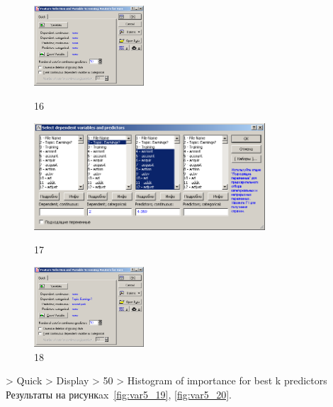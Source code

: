 \begin{figure}[!h]
  \centering

  \begin{minipage}{0.22\textwidth}
    \centering

    \includegraphics[height=3cm]
    {inc/var5/16.PNG}

    \caption{16}

    \label{fig:var5_16}
  \end{minipage}
  \begin{minipage}{0.52\textwidth}
    \centering

    \includegraphics[height=4cm]
    {inc/var5/17.PNG}

    \caption{17}

    \label{fig:var5_17}
  \end{minipage}
  \begin{minipage}{0.22\textwidth}
    \centering

    \includegraphics[height=3cm]
    {inc/var5/18.PNG}

    \caption{18}

    \label{fig:var5_18}
  \end{minipage}
\end{figure}

> Quick > Display > 50 > Histogram of importance for best k predictors \\

Результаты на рисункax~\ref{fig:var5_19}, \ref{fig:var5_20}.

